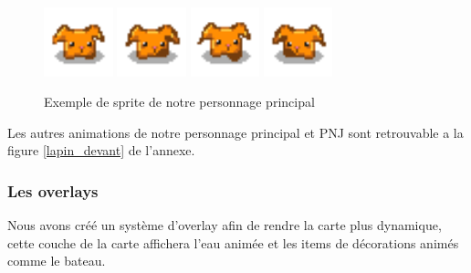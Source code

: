 \documentclass{article}
\begin{document}
\begin{figure}[h]
    \centering
    \includegraphics[height = 2cm]{haricot/forward_0.png}
    \includegraphics[height = 2cm]{haricot/forward_1.png}
    \includegraphics[height = 2cm]{haricot/forward_2.png}
    \includegraphics[height = 2cm]{haricot/forward_3.png}
    \caption{Exemple de sprite de notre personnage principal}
\end{figure}

Les autres animations de notre personnage principal et PNJ sont retrouvable a la figure \ref{lapin_devant} de l'annexe.
\\
\newpage
\subsubsection{Les overlays}
Nous avons créé un système d'overlay afin de rendre la carte plus dynamique, cette couche de la carte affichera l'eau animée et les items de décorations animés comme le bateau. \newline
\end{document}
